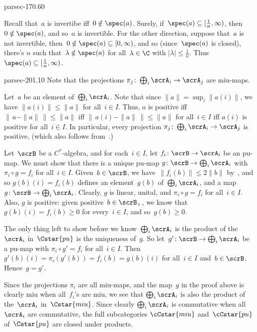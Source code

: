 \documentclass[b5page]{book}
\begin{document}
\begin{solution}{parsec-170.60}
\begin{enumerate}
Recall that~$a$ is invertibe iff~$0\notin\spec(a)$.
Surely, if~$\spec(a)\subseteq [\frac{1}{n},\infty)$,
then~$0\notin \spec(a)$, and so~$a$ is invertible.
For the other direction,
suppose that~$a$ is not invertible,
then~$0\notin \spec(a)\subseteq [0,\infty)$,
and so (since~$\spec(a)$ is closed),
there's $n$ such that~$\lambda\notin \spec(a)$
for all~$\lambda\in \C$ with $\left|\lambda\right|\leq \frac{1}{n}$.
Thus $\spec(a)\subseteq[\frac{1}{n},\infty)$.
\end{enumerate}
\end{solution}
\begin{solution}{parsec-201.10}
Note that the projections
$\pi_j\colon\bigoplus_i \scrA_i\to \scrA_j$
are miu-maps.

Let~$a$ be an element of~$\bigoplus_i \scrA_i$.
Note that since
    $\|a\|=\sup_i\|a(i)\|$, we have $\|a(i)\|\leq \|a\|$ for all~$i\in I$.
Thus, $a$ is positive iff
$\|\,a-\|a\|\,\|\leq\|a\|$
    iff $\|\,a(i)-\|a\|\,\|\leq \|a\|$
    for all~$i\in I$
    iff $a(i)$ is positive for all~$i\in I$.
In particular,
every projection $\pi_j\colon \bigoplus_i\scrA_i\to\scrA_j$
is positive,
    (which also follows from~.)

Let~$\scrB$ be a $C^*$-algebra,
and for each~$i\in I$,
let $f_i\colon \scrB \to \scrA_i$ be an pu-map.
We must show that there is a unique
    pu-map $g\colon \scrB\to \bigoplus_i \scrA_i $
    with~$\pi_i\circ g = f_i$ for all~$i\in I$.
Given~$b\in \scrB$,
    we have~$\|f_i(b)\|\leq 2\|b\|$
    by~,
    and so $g(b)(i)=f_i(b)$
    defines an element~$g(b)$ of~$\bigoplus_i\scrA_i$,
    and a map~$g\colon \scrB\to\bigoplus_i\scrA_i$.
Clearly, $g$ is linear, unital,
    and $\pi_i\circ g = f_i$ for all~$i\in I$.
Also, $g$ is positive:
given positive~$b\in \scrB_+$,
we know that~$g(b)(i)=f_i(b)\geq 0$ for every~$i\in I$,
    and so~$g(b)\geq 0$.

The only thing left to show
before we know~$\bigoplus_i \scrA_i$
is the product of the~$\scrA_i$
    in~$\Cstar{pu}$
    is the uniqueness of~$g$.
So let~$g'\colon \scrB\to\bigoplus_i\scrA_i$
be a pu-map
with $\pi_i\circ g' =f_i$ for all~$i\in I$.
Then 
    $g'(b)(i)=\pi_i(g'(b))
    = f_i(b) = g(b)(i)$
    for all~$i\in I$ and~$b\in\scrB$.
    Hence~$g=g'$.

Since the projections $\pi_i$ are all miu-maps,
and the map~$g$ in the proof above is clearly miu when all~$f_i$'s are miu,
we see that $\bigoplus_i\scrA_i$ is also the product
    of the~$\scrA_i$ in~$\Cstar{miu}$.
Since clearly $\bigoplus_i \scrA_i$ is commutative
when all~$\scrA_i$ are commutative,
the full subcategories
    $\cCstar{miu}$ and~$\cCstar{pu}$
    of~$\Cstar{pu}$
    are closed under products.
\end{solution}
\end{document}
